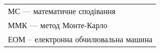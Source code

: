 
\begin{tabular}{l}
	МС — математичне сподівання \\
	ММК — метод Монте-Карло \\
	ЕОМ – електронна обчилювальна машина
\end{tabular}